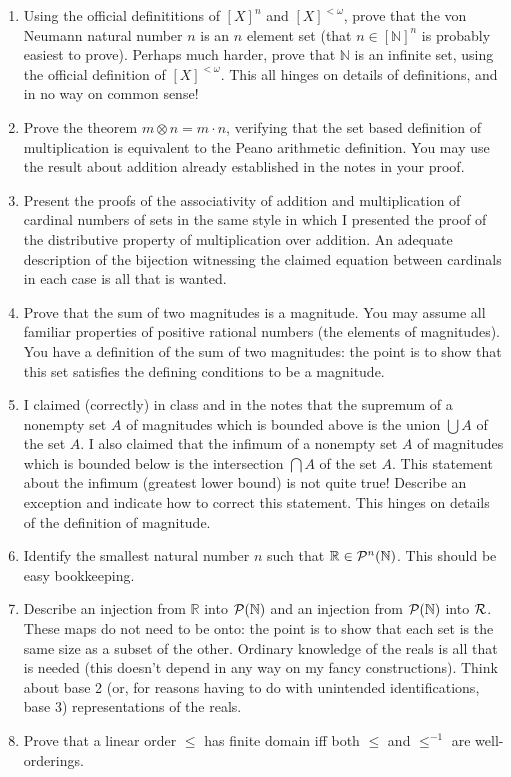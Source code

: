 \documentclass[12pt]{book}
\begin{document}
\begin{enumerate}

\item  Using the official definititions of $[X]^n$ and $[X]^{<\omega}$, prove that the von Neumann natural number $n$ is an $n$ element set
(that $n \in [\mathbb N]^n$ is probably easiest to prove).  Perhaps much harder, prove that $\mathbb N$ is an infinite set, using the official definition of
$[X]^{<\omega}$.  This all hinges on details of definitions, and in no way on common sense!

\item Prove the theorem $m \otimes n = m \cdot n$, verifying that the set based definition of multiplication is equivalent to the Peano arithmetic definition.  You may use the result about addition already established in the notes in your proof.

\item Present the proofs of the associativity of addition and multiplication of cardinal numbers of sets in the same style in which I presented the proof of the distributive property of multiplication over addition.  An adequate description of the bijection witnessing the claimed equation between cardinals in each case is all that is wanted.

\item  Prove that the sum of two magnitudes is a magnitude.  You may assume all familiar properties of positive rational numbers (the elements of magnitudes).  You have a definition of the sum of two magnitudes:  the point is to show that this set satisfies the defining conditions to be a magnitude.

\item I claimed (correctly) in class and in the notes that the supremum of a nonempty set $A$ of magnitudes which is bounded above is
the union $\bigcup A$ of the set $A$.  I also claimed that the infimum of a nonempty set $A$ of magnitudes which is bounded below is the intersection $\bigcap A$ of the set $A$.  This statement about the infimum (greatest lower bound) is not quite true!  Describe an exception and indicate how to correct this statement.  This hinges on details of the definition of magnitude.

\item Identify the smallest natural number $n$ such that $\mathbb R \in {\cal P}^n(\mathbb N)$.   This should be easy bookkeeping.

\item  Describe an injection from $\mathbb R$ into ${\cal P}(\mathbb N)$ and an injection from ${\cal P}(\mathbb N)$ into $\cal R$.  These maps do not need to be onto:  the point is to show that each set is the same size as a subset of the other.  Ordinary knowledge of the reals is all that is needed (this doesn't depend in any way on my fancy constructions).  Think about base 2 (or, for reasons having to do with unintended identifications, base 3) representations of the reals.

\item  Prove that a linear order $\leq$ has finite domain iff both $\leq$ and $\leq^{-1}$ are well-orderings.

\end{enumerate}
\end{document}

